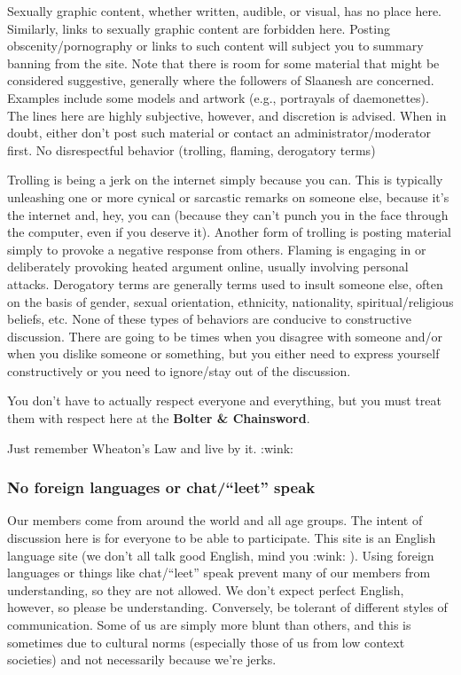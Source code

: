 \documentclass[12pt]{article}
\newcommand{\bnc}{{\textbf{Bolter \& Chainsword}}}%
\begin{document}
Sexually graphic content, whether written, audible, or visual, has no 
place here. Similarly, links to sexually graphic content are forbidden 
here. Posting obscenity/pornography or links to such content will 
subject you to summary banning from the site.
Note that there is room for some material that might be considered 
suggestive, generally where the followers of Slaanesh are concerned. 
Examples include some models and artwork (e.g., portrayals of 
daemonettes). The lines here are highly subjective, however, and 
discretion is advised. When in doubt, either don't post such material 
or contact an administrator/moderator first.
No disrespectful behavior (trolling, flaming, derogatory terms)

Trolling is being a jerk on the internet simply because you can. This 
is typically unleashing one or more cynical or sarcastic remarks on 
someone else, because it's the internet and, hey, you can (because they 
can't punch you in the face through the computer, even if you deserve 
it). Another form of trolling is posting material simply to provoke a 
negative response from others.
Flaming is engaging in or deliberately provoking heated argument 
online, usually involving personal attacks.
Derogatory terms are generally terms used to insult someone else, often 
on the basis of gender, sexual orientation, ethnicity, nationality, 
spiritual/religious beliefs, etc.
None of these types of behaviors are conducive to constructive 
discussion. There are going to be times when you disagree with someone 
and/or when you dislike someone or something, but you either need to 
express yourself constructively or you need to ignore/stay out of the 
discussion.

You don't have to actually respect everyone and everything, but you 
must treat them with respect here at the {\bnc}.

Just remember Wheaton's Law and live by it. :wink:

\subsubsection{No foreign languages or chat/``leet'' speak}

Our members come from around the world and all age groups. The intent 
of discussion here is for everyone to be able to participate. This site 
is an English language site (we don't all talk good English, mind you 
:wink: ). Using foreign languages or things like chat/``leet'' speak 
prevent many of our members from understanding, so they are not 
allowed. We don't expect perfect English, however, so please be 
understanding. Conversely, be tolerant of different styles of 
communication. Some of us are simply more blunt than others, and this 
is sometimes due to cultural norms (especially those of us from low 
context societies) and not necessarily because we're jerks.
\end{document}
